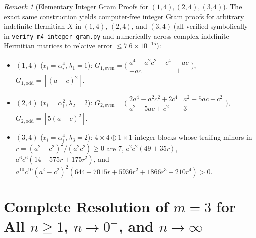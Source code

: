 \documentclass[11pt,a4paper]{article}
\theoremstyle{remark}
\newtheorem{remark}[theorem]{Remark}
\begin{document}
\begin{remark}[Elementary Integer Gram Proofs for $(1,4),(2,4),(3,4)$]
The exact same construction yields computer-free integer Gram proofs for arbitrary indefinite Hermitian $X$ in $(1,4)$, $(2,4)$, and $(3,4)$ (all verified symbolically in \texttt{verify\_m4\_integer\_gram.py} and numerically across complex indefinite Hermitian matrices to relative error $\le 7.6\times 10^{-15}$):
\begin{itemize}
  \item $(1,4)$ ($x_i=\alpha_i^4, \lambda_1=1$): $G_{1,\mathrm{even}}=\bigl(\begin{smallmatrix}a^4-a^2c^2+c^4 & -ac\\ -ac & 1\end{smallmatrix}\bigr)$, $G_{1,\mathrm{odd}}=[(a-c)^2]$.
  \item $(2,4)$ ($x_i=\alpha_i^2, \lambda_2=2$): $G_{2,\mathrm{even}}=\bigl(\begin{smallmatrix}2a^4-a^2c^2+2c^4 & a^2-5ac+c^2\\ a^2-5ac+c^2 & 3\end{smallmatrix}\bigr)$, $G_{2,\mathrm{odd}}=[5(a-c)^2]$.
  \item $(3,4)$ ($x_i=\alpha_i^4, \lambda_3=2$): $4\times 4\oplus 1\times 1$ integer blocks whose trailing minors in $r=(a^2-c^2)^2/(a^2c^2)\ge 0$ are $7$, $a^2c^2(49+35r)$, $a^6c^6(14+575r+175r^2)$, and $a^{10}c^{10}(a^2-c^2)^2(644+7015r+5936r^2+1866r^3+210r^4)>0$.
\end{itemize}
\end{remark}

\section{Complete Resolution of $m=3$ for All $n\ge 1$, $n\to 0^+$, and $n\to\infty$}
\end{document}
